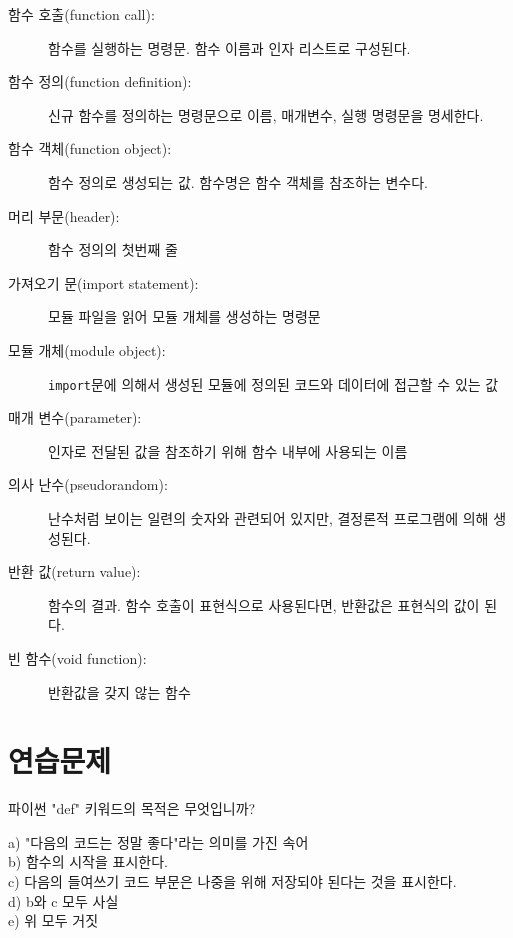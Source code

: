 \begin{description}
\item[함수 호출(function call):] 함수를 실행하는 명령문. 함수 이름과 인자 리스트로 구성된다.

\item[함수 정의(function definition):] 신규 함수를 정의하는 명령문으로 이름, 매개변수, 실행 명령문을 명세한다.

\item[함수 객체(function object):] 함수 정의로 생성되는 값. 함수명은 함수 객체를 참조하는 변수다.

\item[머리 부문(header):] 함수 정의의 첫번째 줄

\item[가져오기 문(import statement):] 모듈 파일을 읽어 모듈 개체를 생성하는 명령문

\item[모듈 개체(module object):] {\tt import}문에 의해서 생성된 모듈에 정의된 코드와 데이터에 접근할 수 있는 값

\item[매개 변수(parameter):] 인자로 전달된 값을 참조하기 위해 함수 내부에 사용되는 이름

\item[의사 난수(pseudorandom):] 난수처럼 보이는 일련의 숫자와 관련되어 있지만, 결정론적 프로그램에 의해 생성된다.

\item[반환 값(return value):] 함수의 결과. 함수 호출이 표현식으로 사용된다면, 반환값은 표현식의 값이 된다. 

\item[빈 함수(void function):] 반환값을 갖지 않는 함수

\end{description}


\section{연습문제}

\begin{ex}
파이썬 "def" 키워드의 목적은 무엇입니까?

a) "다음의 코드는 정말 좋다"라는 의미를 가진 속어\\
b) 함수의 시작을 표시한다.\\
c) 다음의 들여쓰기 코드 부문은 나중을 위해 저장되야 된다는 것을 표시한다.\\
d) b와 c 모두 사실\\
e) 위 모두 거짓
\end{ex}

